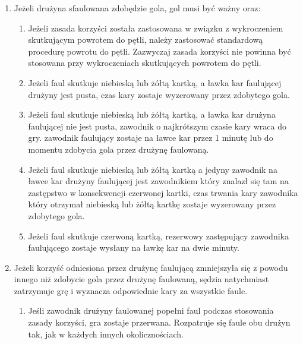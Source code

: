 \documentclass[12pt]{article}
\begin{document}
\begin{enumerate}
	\item
	      Jeżeli drużyna sfaulowana zdobędzie gola, gol musi być ważny oraz:

	      \begin{enumerate}
		      \item
		            Jeżeli zasada korzyści została zastosowana w związku z wykroczeniem
		            skutkującym powrotem do pętli, należy zastosować standardową
		            procedurę powrotu do pętli. Zazwyczaj zasada korzyści nie powinna
		            być stosowana przy wykroczeniach skutkujących powrotem do pętli.
		      \item
		            Jeżeli faul skutkuje niebieską lub żółtą kartką, a ławka kar
		            faulującej drużyny jest pusta, czas kary zostaje wyzerowany przez
		            zdobytego gola.
		      \item
		            Jeżeli faul skutkuje niebieską lub żółtą kartką, a ławka kar drużyna
		            faulującej nie jest pusta, zawodnik o najkrótszym czasie kary wraca
		            do gry. zawodnik faulujący zostaje na ławce kar przez 1 minutę lub
		            do momentu zdobycia gola przez drużynę faulowaną.
		      \item
		            Jeżeli faul skutkuje niebieską lub żółtą kartką a jedyny zawodnik na
		            ławce kar drużyny faulującej jest zawodnikiem który znalazł się tam
		            na zastępstwo w konsekwencji czerwonej kartki, czas trwania kary
		            zawodnika który otrzymał niebieską lub żółtą kartkę zostaje
		            wyzerowany przez zdobytego gola.
		      \item
		            Jeżeli faul skutkuje czerwoną kartką, rezerwowy zastępujący
		            zawodnika faulującego zostaje wysłany na ławkę kar na dwie minuty.
	      \end{enumerate}
	\item
	      Jeżeli korzyść odniesiona przez drużynę faulującą zmniejszyła się z
	      powodu innego niż zdobycie gola przez drużynę faulowaną, sędzia
	      natychmiast zatrzymuje grę i wyznacza odpowiednie kary za wszystkie
	      faule.

	      \begin{enumerate}
		      \item
		            Jeśli zawodnik drużyny faulowanej popełni faul podczas stosowania
		            zasady korzyści, gra zostaje przerwana. Rozpatruje się faule obu
		            drużyn tak, jak w każdych innych okolicznościach.


\end{enumerate}
\end{enumerate}
\end{document}
